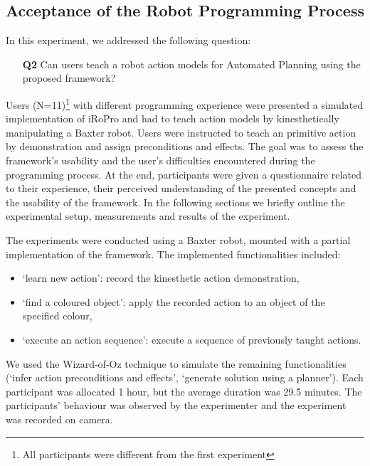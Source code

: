 \subsection{Acceptance of the Robot Programming Process} \label{sec:Exp2}
In this experiment, we addressed the following question:
\begin{enumerate}
	\item[\textbf{Q2}] Can users teach a robot action models for Automated Planning using the proposed framework?
\end{enumerate}
	Users (N=11)\footnote{All participants were different from the first experiment} with different programming experience were presented a simulated implementation of iRoPro and had to teach action models by kinesthetically manipulating a Baxter robot. 
	Users were instructed to teach an primitive action by demonstration and assign preconditions and effects.
	The goal was to assess the framework's usability and the user's difficulties encountered during the programming process.
	At the end, participants were given a questionnaire related to their experience, their perceived understanding of the presented concepts and the usability of the framework.
	In the following sections we briefly outline the experimental setup, measurements and results of the experiment.

The experiments were conducted using a Baxter robot, mounted with a partial implementation of the framework.
The implemented functionalities included:
\begin{itemize}
	\item `learn new action': record the kinesthetic action demonstration,
	\item `find a coloured object': apply the recorded action to an object of the specified colour,
	\item `execute an action sequence': execute a sequence of previously taught actions.
\end{itemize}

We used the Wizard-of-Oz technique to simulate the remaining functionalities (\eg `infer action preconditions and effects', `generate solution using a planner').
Each participant was allocated 1 hour, but the average duration was 29.5 minutes. 
The participants' behaviour was observed by the experimenter and the experiment was recorded on camera.

